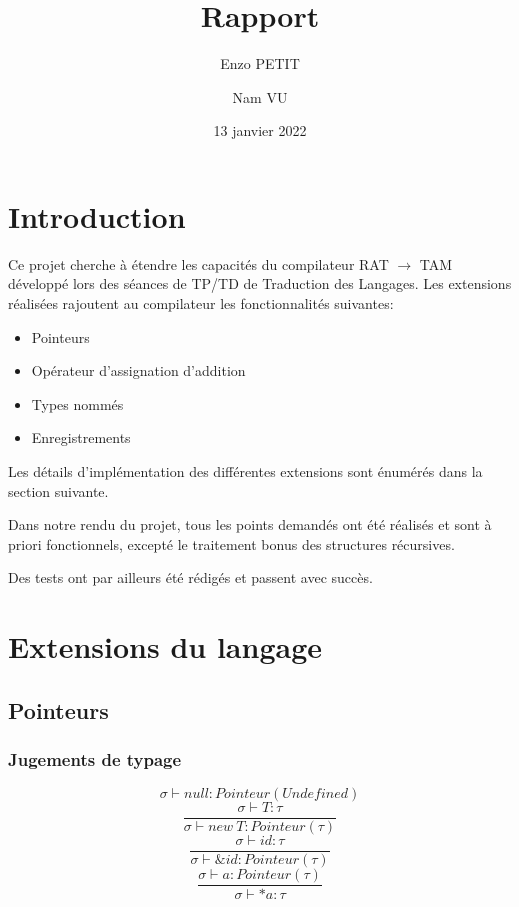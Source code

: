 \documentclass[headings=standardclasses,parskip=half]{scrartcl}
\title{Rapport}
\subtitle{}
\author{Enzo PETIT \and Nam VU}
\date{13 janvier 2022}
\begin{document}
\maketitle

\pagebreak

\tableofcontents

\pagebreak

\section{Introduction}

Ce projet cherche à étendre les capacités du compilateur RAT \(\to\)
TAM développé lors des séances de TP/TD de Traduction des Langages.
Les extensions réalisées rajoutent au compilateur
les fonctionnalités suivantes:

\begin{itemize}
    \item Pointeurs
    \item Opérateur d'assignation d'addition
    \item Types nommés
    \item Enregistrements
\end{itemize}

Les détails d'implémentation des différentes extensions sont énumérés
dans la section suivante.

Dans notre rendu du projet, tous les points demandés ont été réalisés
et sont à priori fonctionnels, excepté le traitement bonus des structures
récursives.

Des tests ont par ailleurs été rédigés et passent avec succès.

\section{Extensions du langage}

\subsection{Pointeurs}

\subsubsection*{Jugements de typage}

\[\sigma \vdash null : Pointeur(Undefined)\]
\[\frac{\sigma \vdash T : \tau}{\sigma \vdash new\ T : Pointeur(\tau)}\]
\[\frac{\sigma \vdash id : \tau}{\sigma \vdash \&id : Pointeur(\tau)}\]
\[\frac{\sigma \vdash a : Pointeur(\tau)}{\sigma \vdash *a : \tau}\]
\end{document}
